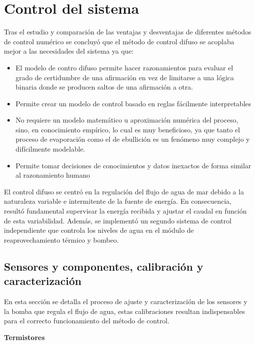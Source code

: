 			
				
				
	\section{Control del sistema}
	
		Tras el estudio y comparación de las ventajas y desventajas de diferentes métodos de control numérico se concluyó que el método de control difuso se acoplaba mejor a las necesidades del sistema ya que:
		
		\begin{itemize}
			\item El modelo de contro difuso permite hacer razonamientos para evaluar el grado de certidumbre de una afirmación en vez de limitarse a una lógica binaria donde se producen saltos de una afirmación a otra.
			\item Permite crear un modelo de control basado en reglas fácilmente interpretables
			\item No requiere un modelo matemático u aproximación numérica del proceso, sino, en conocimiento empírico, lo cual es muy beneficioso, ya que tanto el proceso de evaporación como el de ebullición es un fenómeno muy complejo y difícilmente modelable.
			\item Permite tomar decisiones de conocimientos y datos inexactos de forma similar al razonamiento humano
		\end{itemize}
		
		El control difuso se centró en la regulación del flujo de agua de mar debido a la naturaleza variable e intermitente de la fuente de energía. En consecuencia, resultó fundamental supervisar la energía recibida y ajustar el caudal en función de esta variabilidad. Además, se implementó un segundo sistema de control independiente que controla los niveles de agua en el módulo de reaprovechamiento térmico y bombeo.
		
		\subsection{Sensores y componentes, calibración y caracterización}\label{subsec:calibración}
		
			En esta sección se detalla el proceso de ajuste y caracterización de los sensores y la bomba que regula el flujo de agua, estas calibraciones resultan indispensables para el correcto funcionamiento del método de control.
			
			\textbf{Termistores}\par
			
